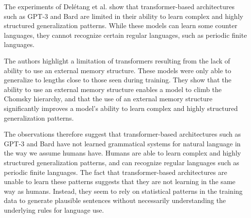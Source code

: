 \documentclass[10pt]{article}
\newenvironment{AnswerBox}{\begin{mdframed}[style=simple]}{\end{mdframed}}
\begin{document}
\begin{AnswerBox}%

  The experiments of Del\'etang et al. show that transformer-based architectures such as GPT-3 and Bard are limited in their ability to learn complex and highly structured generalization patterns. While these models can learn some counter languages, they cannot recognize certain regular languages, such as periodic finite languages. 

  The authors highlight a limitation of transformers resulting from the lack of ability to use an external memory structure. These models were only able to generalize to lengths close to those seen during training. They show that the ability to use an external memory structure enables a model to climb the Chomsky hierarchy, and that the use of an external memory structure significantly improves a model's ability to learn complex and highly structured generalization patterns.

  The observations therefore suggest that transformer-based architectures such as GPT-3 and Bard have not learned grammatical systems for natural language in the way we assume humans have. Humans are able to learn complex and highly structured generalization patterns, and can recognize regular languages such as periodic finite languages. The fact that transformer-based architectures are unable to learn these patterns suggests that they are not learning in the same way as humans. Instead, they seem to rely on statistical patterns in the training data to generate plausible sentences without necessarily understanding the underlying rules for language use. 

\end{AnswerBox}%
\end{document}
